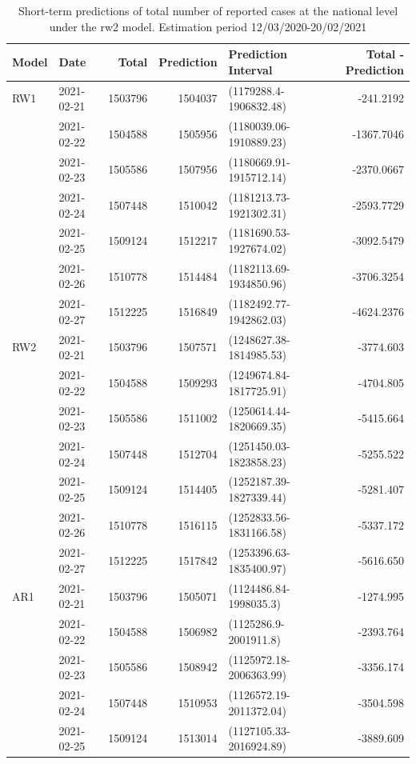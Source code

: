\documentclass[10pt,letterpaper]{article}
\begin{document}
\begin{table}[!h]

\caption{\label{tab:unnamed-chunk-10}Short-term predictions of total number of reported cases at the national level under the rw2 model. Estimation period 12/03/2020-20/02/2021}
\centering
\begin{tabular}[t]{l|l|r|r|l|r}
\hline
Model&Date & Total & Prediction & Prediction Interval & Total - Prediction\\
\hline
RW1&2021-02-21 & 1503796 & 1504037 & (1179288.4-1906832.48) & -241.2192\\
&2021-02-22 & 1504588 & 1505956 & (1180039.06-1910889.23) & -1367.7046\\
&2021-02-23 & 1505586 & 1507956 & (1180669.91-1915712.14) & -2370.0667\\
&2021-02-24 & 1507448 & 1510042 & (1181213.73-1921302.31) & -2593.7729\\
&2021-02-25 & 1509124 & 1512217 & (1181690.53-1927674.02) & -3092.5479\\
&2021-02-26 & 1510778 & 1514484 & (1182113.69-1934850.96) & -3706.3254\\
&2021-02-27 & 1512225 & 1516849 & (1182492.77-1942862.03) & -4624.2376\\
\hline
RW2&2021-02-21 & 1503796 & 1507571 & (1248627.38-1814985.53) & -3774.603\\
&2021-02-22 & 1504588 & 1509293 & (1249674.84-1817725.91) & -4704.805\\
&2021-02-23 & 1505586 & 1511002 & (1250614.44-1820669.35) & -5415.664\\
&2021-02-24 & 1507448 & 1512704 & (1251450.03-1823858.23) & -5255.522\\
&2021-02-25 & 1509124 & 1514405 & (1252187.39-1827339.44) & -5281.407\\
&2021-02-26 & 1510778 & 1516115 & (1252833.56-1831166.58) & -5337.172\\
&2021-02-27 & 1512225 & 1517842 & (1253396.63-1835400.97) & -5616.650\\
\hline
AR1&2021-02-21 & 1503796 & 1505071 & (1124486.84-1998035.3) & -1274.995\\
&2021-02-22 & 1504588 & 1506982 & (1125286.9-2001911.8) & -2393.764\\
&2021-02-23 & 1505586 & 1508942 & (1125972.18-2006363.99) & -3356.174\\
&2021-02-24 & 1507448 & 1510953 & (1126572.19-2011372.04) & -3504.598\\
&2021-02-25 & 1509124 & 1513014 & (1127105.33-2016924.89) & -3889.609\\

\end{tabular}
\end{table}
\end{document}
